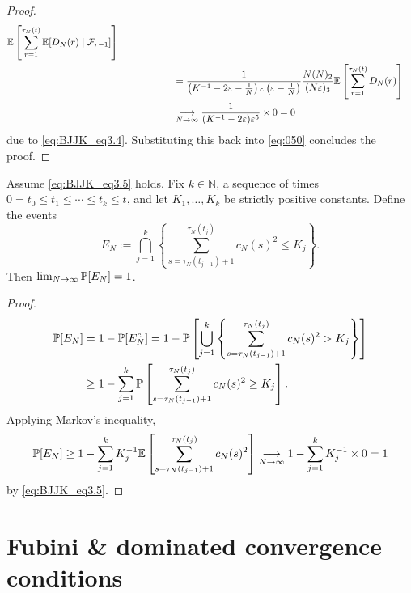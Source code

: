 \begin{proof}
\begin{align*}
        \mathbb{E}\left[ \sum_{r=1}^{\tau_N(t)} \mathbb{E}[ D_N(r) 
        \mid \mathcal{F}_{r-1} ] \right] \\
&\hspace{2cm}= \frac{1}{\left( K^{-1} - 2\varepsilon- \frac{1}{N} \right) \varepsilon 
        \left( \varepsilon-\frac{1}{N} \right)} \frac{N(N)_2}{(N\varepsilon)_3}
        \mathbb{E}\left[ \sum_{r=1}^{\tau_N(t)} D_N(r) \right] \\
&\hspace{2cm}\underset{N\to\infty}{\longrightarrow} 
        \frac{1}{(K^{-1} - 2\varepsilon)\varepsilon^5} \times0
=0
\end{align*}
due to \eqref{eq:BJJK_eq3.4}.
Substituting this back into \eqref{eq:050} concludes the proof.
\end{proof}



\begin{lemma}\label{thm:indicators_c2}
Assume \eqref{eq:BJJK_eq3.5} holds.
Fix $k\in\mathbb{N}$, a sequence of times $0 = t_0 \leq t_1 \leq \cdots \leq t_k \leq t$, and let $K_1,\dots,K_k$ be strictly positive constants.
Define the events
\begin{equation*}
E_N := \bigcap_{j=1}^k \left\{ \sum_{s=\tau_N(t_{j-1})+1}^{\tau_N(t_j)}
        c_N(s)^2 \leq K_j \right\} .
\end{equation*}
Then $\lim_{N\to\infty} \mathbb{P}[E_N] =1$.
\end{lemma}

\begin{proof}
\begin{align*}
\mathbb{P}[E_N]
&= 1- \mathbb{P}[E_N^c]
= 1- \mathbb{P}\left[ \bigcup_{j=1}^k \left\{ \sum_{s=\tau_N(t_{j-1})+1}
        ^{\tau_N(t_j)} c_N(s)^2 > K_j \right\} \right] \\
&\geq 1- \sum_{j=1}^k \mathbb{P}\left[ \sum_{s=\tau_N(t_{j-1})+1}
        ^{\tau_N(t_j)} c_N(s)^2 \geq K_j \right] .
\end{align*}
Applying Markov's inequality,
\begin{equation*}
\mathbb{P}[E_N]
\geq 1- \sum_{j=1}^k K_j^{-1} \mathbb{E}\left[ \sum_{s=\tau_N(t_{j-1})+1}
        ^{\tau_N(t_j)} c_N(s)^2 \right]
\underset{N\to\infty}{\longrightarrow} 1- \sum_{j=1}^k K_j^{-1} \times 0 
= 1
\end{equation*}
by \eqref{eq:BJJK_eq3.5}.
\end{proof}




\section{Fubini \& dominated convergence conditions}

